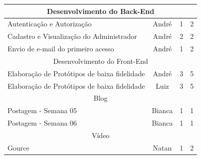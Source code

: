 \documentclass[
    12pt,               %
    openright,          %
    oneside,
    a4paper,            %
    english,            %
    brazil              %
    ]{ifsp-spo-inf-ctds} %
\begin{document}
\begin{apendicesenv}
\begin{quadro}[htb]
\begin{tabular}{|l|c|c|c|}
    \multicolumn{4}{|c|}{Desenvolvimento do Back-End} \\ \hline
    Autenticação e Autorização & André & 1  &  2  \\ \hline 
    Cadastro e Visualização do Administrador & André & 2  &  2  \\ \hline 
    Envio de e-mail do primeiro acesso & André & 1  & 2   \\ \hline 
    
    \multicolumn{4}{|c|}{Desenvolvimento do Front-End} \\ \hline
    Elaboração de Protótipos de baixa fidelidade & André & 3  & 5  \\ \hline 
    Elaboração de Protótipos de baixa fidelidade & Luiz & 3  & 5   \\ \hline 
    
    \multicolumn{4}{|c|}{Blog} \\ \hline
    Postagem - Semana 05      & Bianca    & 1  & 1    \\ \hline
    Postagem - Semana 06      & Bianca     & 1 & 1  \\ \hline
    
    \multicolumn{4}{|c|}{Vídeo} \\ \hline
    Gource & Natan & 1  &  2  \\ \hline
    
\end{tabular}
\end{quadro}
\FloatBarrier


\end{apendicesenv}
\end{document}
